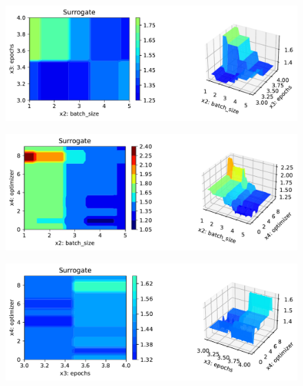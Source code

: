 \documentclass[
  letterpaper,
  DIV=11,
  numbers=noendperiod]{scrreprt}
\begin{document}
\begin{figure}[H]

{\centering \includegraphics{14_spot_ray_hpt_torch_cifar10_files/figure-pdf/cell-32-output-5.pdf}

}

\end{figure}

\begin{figure}[H]

{\centering \includegraphics{14_spot_ray_hpt_torch_cifar10_files/figure-pdf/cell-32-output-6.pdf}

}

\end{figure}

\begin{figure}[H]

{\centering \includegraphics{14_spot_ray_hpt_torch_cifar10_files/figure-pdf/cell-32-output-7.pdf}

}

\end{figure}
\end{document}
